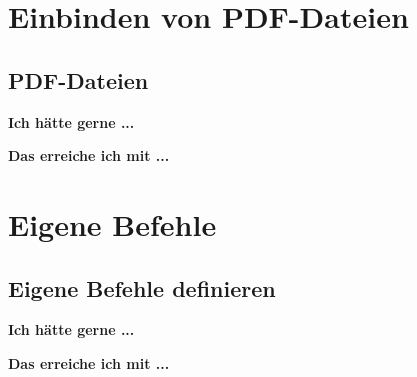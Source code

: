 \documentclass[twoside, 
               a4paper, 
               10pt, 
               parskip=full, 
               sectionentrydots=true, 
               listof=totoc, 
               listof=entryprefix,
               numbers=endperiod]{scrartcl}
\begin{document}
\newpage
\section{Einbinden von PDF-Dateien}
\subsection{PDF-Dateien}

{\textbf {Ich hätte gerne ...}}
 
\begin{miniSeite}[colbacktitle=black!35!white,title=Ausdruck]

\end{miniSeite}


\newpage
{\textbf {Das erreiche ich mit ...}}
 
\begin{miniSeite}[colbacktitle=black!35!white,title=\LaTeX-Code]

\end{miniSeite}





\newpage
\section{Eigene Befehle}
\subsection{Eigene Befehle definieren}

{\textbf {Ich hätte gerne ...}}
 
\begin{miniSeite}[colbacktitle=black!35!white,title=Ausdruck]

\end{miniSeite}


\newpage
{\textbf {Das erreiche ich mit ...}}
 
\begin{miniSeite}[colbacktitle=black!35!white,title=\LaTeX-Code]

\end{miniSeite}

\end{document}
